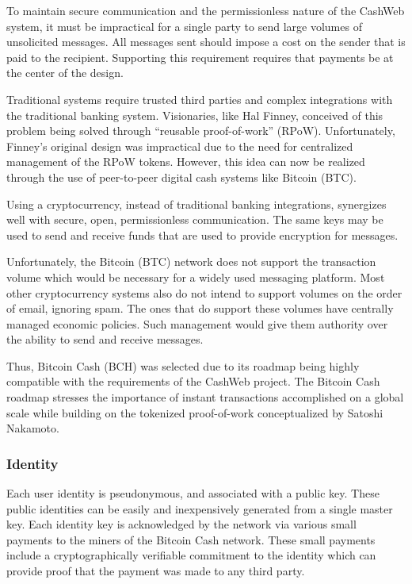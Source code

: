 \documentclass{article}
\begin{document}
To maintain secure communication and the permissionless nature of the CashWeb system, it must be impractical for a single party to send large volumes of unsolicited messages. All messages sent should impose a cost on the sender that is paid to the recipient. Supporting this requirement requires that payments be at the center of the design.

Traditional systems require trusted third parties and complex integrations with the traditional banking system. Visionaries, like Hal Finney, conceived of this problem being solved through ``reusable proof-of-work'' (RPoW). Unfortunately, Finney's original design was impractical due to the need for centralized management of the RPoW tokens. However, this idea can now be realized through the use of peer-to-peer digital cash systems like Bitcoin (BTC).

Using a cryptocurrency, instead of traditional banking integrations, synergizes well with secure, open, permissionless communication. The same keys may be used to send and receive funds that are used to provide encryption for messages.

Unfortunately, the Bitcoin (BTC) network does not support the transaction volume which would be necessary for a widely used messaging platform. Most other cryptocurrency systems also do not intend to support volumes on the order of email, ignoring spam. The ones that do support these volumes have centrally managed economic policies. Such management would give them authority over the ability to send and receive messages.

Thus, Bitcoin Cash (BCH) was selected due to its roadmap being highly compatible with the requirements of the CashWeb project. The Bitcoin Cash roadmap stresses the importance of instant transactions accomplished on a global scale while building on the tokenized proof-of-work conceptualized by Satoshi Nakamoto.

\subsubsection{Identity}

Each user identity is pseudonymous, and associated with a public key. These public identities can be easily and inexpensively generated from a single master key. Each identity key is acknowledged by the network via various small payments to the miners of the Bitcoin Cash network. These small payments include a cryptographically verifiable commitment to the identity which can provide proof that the payment was made to any third party.
\end{document}
